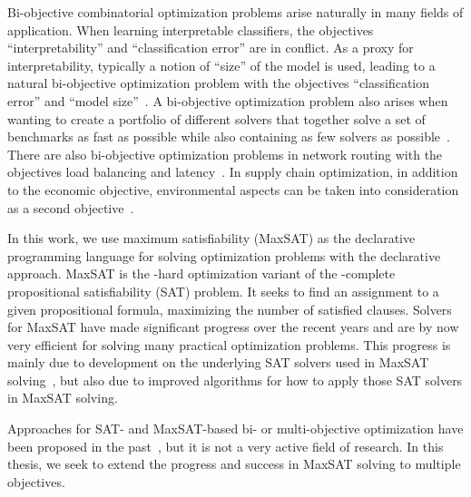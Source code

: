 Bi-objective combinatorial optimization problems arise naturally in many fields of application.
When learning interpretable classifiers, the objectives ``interpretability'' and ``classification error'' are in conflict.
As a proxy for interpretability, typically a notion of ``size'' of the model is used, leading to a natural bi-objective optimization problem with the objectives ``classification error'' and ``model size''~\autocites{DBLP:conf/ijcai/Ignatiev0NS21,DBLP:conf/cp/MaliotovM18,DBLP:conf/ijcai/NarodytskaIPM18,DBLP:conf/ijcai/Hu0HH20,DBLP:conf/cp/YuISB20,DBLP:conf/aaai/Ignatiev0S021,DBLP:conf/cade/IgnatievPNM18}.
A bi-objective optimization problem also arises when wanting to create a portfolio of different solvers that together solve a set of benchmarks as fast as possible while also containing as few solvers as possible~\autocite{DBLP:conf/cp/JanotaMSM21}.
There are also bi-objective optimization problems in network routing with the objectives load balancing and latency~\autocite{SilverioEtAl2022biobjectiveoptimization}.
In supply chain optimization, in addition to the economic objective, environmental aspects can be taken into consideration as a second objective~\autocites{DBLP:journals/cce/Pinto-VarelaBN11,DBLP:journals/candie/TautenhainBN19}.

In this work, we use maximum satisfiability (MaxSAT) as the declarative programming language for solving optimization problems with the declarative approach.
MaxSAT is the \NP-hard optimization variant of the \NP-complete propositional satisfiability (SAT) problem.
It seeks to find an assignment to a given propositional formula, maximizing the number of satisfied clauses.
Solvers for MaxSAT have made significant progress over the recent years and are by now very efficient for solving many practical optimization problems.
This progress is mainly due to development on the underlying SAT solvers used in MaxSAT solving~\autocites{DBLP:journals/ai/FroleyksHIJS21,handbook2-cdcl}, but also due to improved algorithms for how to apply those SAT solvers in MaxSAT solving.

Approaches for SAT- and MaxSAT-based bi- or multi-objective optimization have been proposed in the past~\autocites{DBLP:conf/cp/SohBTB17,DBLP:conf/ijcai/Terra-NevesLM18a,DBLP:conf/aaai/Terra-NevesLM18,DBLP:conf/ijcai/Terra-NevesLM18,DBLP:conf/cp/JanotaMSM21}, but it is not a very active field of research.
In this thesis, we seek to extend the progress and success in MaxSAT solving to multiple objectives.

